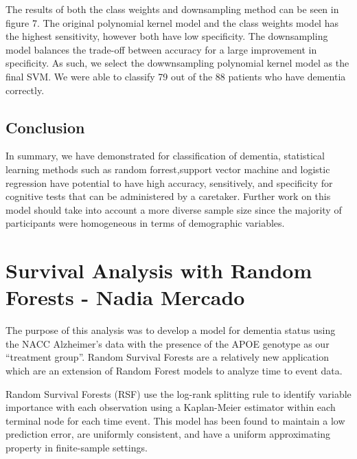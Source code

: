\documentclass[a4paper,man,natbib,11pt]{article}
\begin{document}
The results of both the class weights and downsampling method can be seen in figure 7. The original polynomial kernel model and the class weights model has the highest sensitivity, however both have low specificity. The downsampling model balances the trade-off between accuracy for a large improvement in specificity. As such, we select the dowwnsampling polynomial kernel model as the final SVM. We were able to classify 79 out of the 88 patients who have dementia correctly.

\subsection{Conclusion}

In summary, we have demonstrated for classification of dementia, statistical learning methods such as random forrest,support vector machine and logistic regression have potential to have high accuracy, sensitively, and specificity for cognitive tests that can be administered by a caretaker. Further work on this model should take into account a more diverse sample size since the majority of participants were homogeneous in terms of demographic variables. 

\newpage
\section{Survival Analysis with Random Forests - Nadia Mercado}

The purpose of this analysis was to develop a model for dementia status using the NACC Alzheimer's data with the presence of the APOE genotype as our ``treatment group''. Random Survival Forests are a relatively new application which are an extension of Random Forest models to analyze time to event data. 

Random Survival Forests (RSF) use the log-rank splitting rule to identify variable importance with each observation using a Kaplan-Meier estimator within each terminal node for each time event. This model has been found to maintain a low prediction error, are uniformly consistent, and have a uniform approximating property in finite-sample settings. 
\end{document}
